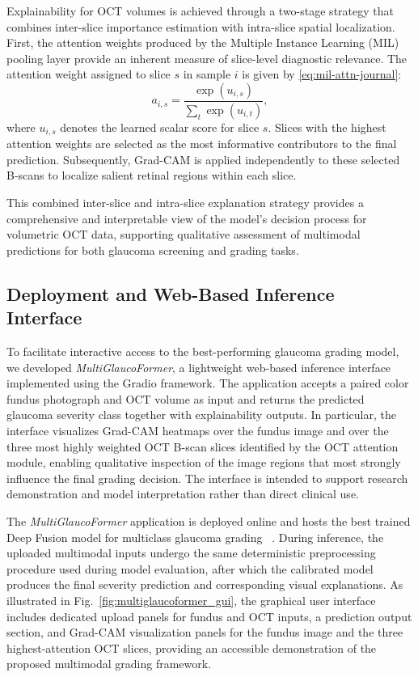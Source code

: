 \documentclass[preprint,12pt]{elsarticle}
\newcommand{\eqrefp}[1]{\eqref{#1}}
\begin{document}
Explainability for OCT volumes is achieved through a two-stage strategy that combines inter-slice importance estimation with intra-slice spatial localization. First, the attention weights produced by the Multiple Instance Learning (MIL) pooling layer provide an inherent measure of slice-level diagnostic relevance. The attention weight assigned to slice $s$ in sample $i$ is given by \eqrefp{eq:mil-attn-journal}:
\begin{equation}
    a_{i,s} = \frac{\exp(u_{i,s})}{\sum_t \exp(u_{i,t})},
    \label{eq:mil-attn-journal}
\end{equation}
where $u_{i,s}$ denotes the learned scalar score for slice $s$. Slices with the highest attention weights are selected as the most informative contributors to the final prediction. Subsequently, Grad-CAM is applied independently to these selected B-scans to localize salient retinal regions within each slice.

This combined inter-slice and intra-slice explanation strategy provides a comprehensive and interpretable view of the model’s decision process for volumetric OCT data, supporting qualitative assessment of multimodal predictions for both glaucoma screening and grading tasks.

\subsection{Deployment and Web-Based Inference Interface}
To facilitate interactive access to the best-performing glaucoma grading model, we developed \textit{MultiGlaucoFormer}, a lightweight web-based inference interface implemented using the Gradio framework. The application accepts a paired color fundus photograph and OCT volume as input and returns the predicted glaucoma severity class together with explainability outputs. In particular, the interface visualizes Grad-CAM heatmaps over the fundus image and over the three most highly weighted OCT B-scan slices identified by the OCT attention module, enabling qualitative inspection of the image regions that most strongly influence the final grading decision. The interface is intended to support research demonstration and model interpretation rather than direct clinical use.

The \textit{MultiGlaucoFormer} application is deployed online and hosts the best trained Deep Fusion model for multiclass glaucoma grading ~\cite{multiglaucoformer_webapp}. During inference, the uploaded multimodal inputs undergo the same deterministic preprocessing procedure used during model evaluation, after which the calibrated model produces the final severity prediction and corresponding visual explanations. As illustrated in Fig.~\ref{fig:multiglaucoformer_gui}, the graphical user interface includes dedicated upload panels for fundus and OCT inputs, a prediction output section, and Grad-CAM visualization panels for the fundus image and the three highest-attention OCT slices, providing an accessible demonstration of the proposed multimodal grading framework.
\end{document}
